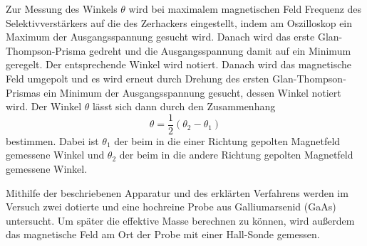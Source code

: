 Zur Messung des Winkels $\theta$ wird bei maximalem magnetischen Feld Frequenz des Selektivverstärkers
auf die des Zerhackers eingestellt, indem am Oszilloskop ein Maximum der Ausgangsspannung gesucht wird.
Danach wird das erste Glan-Thompson-Prisma
gedreht und die Ausgangsspannung damit auf ein Minimum geregelt. Der entsprechende
Winkel wird notiert. Danach wird das magnetische Feld umgepolt und es wird erneut
durch Drehung des ersten Glan-Thompson-Prismas ein Minimum der Ausgangsspannung gesucht,
dessen Winkel notiert wird. Der Winkel $\theta$ lässt sich dann durch den Zusammenhang
\begin{equation}
  \theta  = \frac{1}{2} (\theta_2 - \theta_1)
\label{eqn:drehwinkel}
\end{equation}
bestimmen. Dabei ist $\theta_1$ der beim in die einer Richtung gepolten Magnetfeld gemessene Winkel und
$\theta_2$ der beim in die andere Richtung gepolten Magnetfeld gemessene Winkel.

Mithilfe der beschriebenen Apparatur und des erklärten Verfahrens werden im Versuch zwei dotierte
und eine hochreine Probe aus Galliumarsenid (GaAs) untersucht. Um später die effektive Masse berechnen zu
können, wird außerdem das magnetische Feld am Ort der Probe mit einer Hall-Sonde gemessen.
